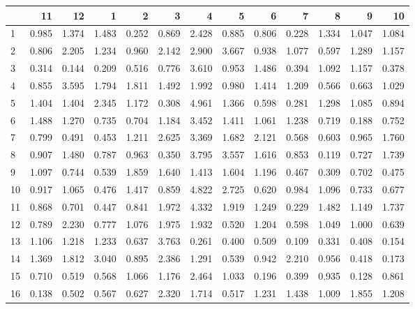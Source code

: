 \begin{tabular}{lrrrrrrrrrrrr}
\toprule
{} &     11 &     12 &     1  &     2  &     3  &     4  &     5  &     6  &     7  &     8  &     9  &     10 \\
\midrule
1   &  0.985 &  1.374 &  1.483 &  0.252 &  0.869 &  2.428 &  0.885 &  0.806 &  0.228 &  1.334 &  1.047 &  1.084 \\
2   &  0.806 &  2.205 &  1.234 &  0.960 &  2.142 &  2.900 &  3.667 &  0.938 &  1.077 &  0.597 &  1.289 &  1.157 \\
3   &  0.314 &  0.144 &  0.209 &  0.516 &  0.776 &  3.610 &  0.953 &  1.486 &  0.394 &  1.092 &  1.157 &  0.378 \\
4   &  0.855 &  3.595 &  1.794 &  1.811 &  1.492 &  1.992 &  0.980 &  1.414 &  1.209 &  0.566 &  0.663 &  1.029 \\
5   &  1.404 &  1.404 &  2.345 &  1.172 &  0.308 &  4.961 &  1.366 &  0.598 &  0.281 &  1.298 &  1.085 &  0.894 \\
6   &  1.488 &  1.270 &  0.735 &  0.704 &  1.184 &  3.452 &  1.411 &  1.061 &  1.238 &  0.719 &  0.188 &  0.752 \\
7   &  0.799 &  0.491 &  0.453 &  1.211 &  2.625 &  3.369 &  1.682 &  2.121 &  0.568 &  0.603 &  0.965 &  1.760 \\
8   &  0.907 &  1.480 &  0.787 &  0.963 &  0.350 &  3.795 &  3.557 &  1.616 &  0.853 &  0.119 &  0.727 &  1.739 \\
9   &  1.097 &  0.744 &  0.539 &  1.859 &  1.640 &  1.413 &  1.604 &  1.196 &  0.467 &  0.309 &  0.702 &  0.475 \\
10  &  0.917 &  1.065 &  0.476 &  1.417 &  0.859 &  4.822 &  2.725 &  0.620 &  0.984 &  1.096 &  0.733 &  0.677 \\
11  &  0.868 &  0.701 &  0.447 &  0.841 &  1.972 &  4.332 &  1.919 &  1.249 &  0.229 &  1.482 &  1.149 &  1.737 \\
12  &  0.789 &  2.230 &  0.777 &  1.076 &  1.975 &  1.932 &  0.520 &  1.204 &  0.598 &  1.049 &  1.000 &  0.639 \\
13  &  1.106 &  1.218 &  1.233 &  0.637 &  3.763 &  0.261 &  0.400 &  0.509 &  0.109 &  0.331 &  0.408 &  0.154 \\
14  &  1.369 &  1.812 &  3.040 &  0.895 &  2.386 &  1.291 &  0.539 &  0.942 &  2.210 &  0.956 &  0.418 &  0.173 \\
15  &  0.710 &  0.519 &  0.568 &  1.066 &  1.176 &  2.464 &  1.033 &  0.196 &  0.399 &  0.935 &  0.128 &  0.861 \\
16  &  0.138 &  0.502 &  0.567 &  0.627 &  2.320 &  1.714 &  0.517 &  1.231 &  1.438 &  1.009 &  1.855 &  1.208 \\

\end{tabular}

